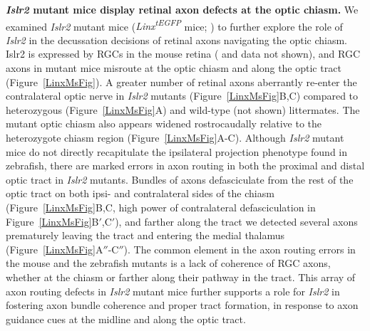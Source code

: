 \textbf{\emph{Islr2} mutant mice display retinal axon defects at the optic chiasm.}\newline
We examined \emph{Islr2} mutant mice (\emph{Linx\textsuperscript{tEGFP}} mice; \cite{mandai2009lig}) to further explore the role of \emph{Islr2} in the decussation decisions of retinal axons navigating the optic chiasm.
Islr2 is expressed by RGCs in the mouse retina ( and data not shown), and RGC axons in mutant mice misroute at the optic chiasm and along the optic tract (Figure~\ref{LinxMsFig}).
A greater number of retinal axons aberrantly re-enter the contralateral optic nerve in \emph{Islr2} mutants (Figure~\ref{LinxMsFig}B,C) compared to heterozygous (Figure~\ref{LinxMsFig}A) and wild-type (not shown) littermates.
The mutant optic chiasm also appears widened rostrocaudally relative to the heterozygote chiasm region (Figure~\ref{LinxMsFig}A-C).
Although \emph{Islr2} mutant mice do not directly recapitulate the ipsilateral projection phenotype found in zebrafish, there are marked errors in axon routing in both the proximal and distal optic tract in \emph{Islr2} mutants.
Bundles of axons defasciculate from the rest of the optic tract on both ipsi- and contralateral sides of the chiasm (Figure~\ref{LinxMsFig}B,C, high power of contralateral defasciculation in Figure~\ref{LinxMsFig}B$'$,C$'$), and farther along the tract we detected several axons prematurely leaving the tract and entering the medial thalamus (Figure~\ref{LinxMsFig}A$''$-C$''$).
The common element in the axon routing errors in the mouse and the zebrafish mutants is a lack of coherence of RGC axons, whether at the chiasm or farther along their pathway in the tract.
This array of axon routing defects in \emph{Islr2} mutant mice further supports a role for \emph{Islr2} in fostering axon bundle coherence and proper tract formation, in response to axon guidance cues at the midline and along the optic tract.

